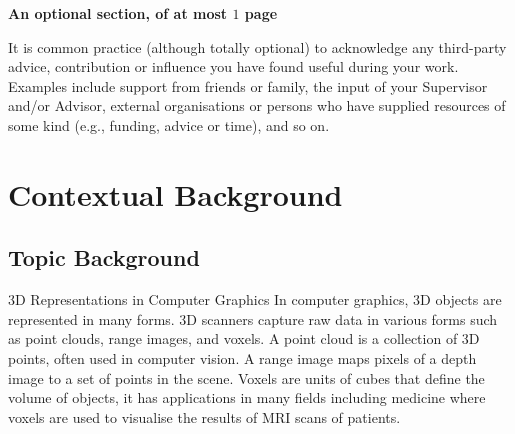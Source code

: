 \documentclass[ %
                    author={Dillon Keith Diep},
                supervisor={Dr. Carl Henrik Ek},
                    degree={MEng},
                     title={Assisted Content Generation for 3D Hair Geometry},
                  subtitle={[INCOMPLETE DRAFT, CONTAINS NOTES FROM RESEARCH]},
                      type={Research},
                      year={2014} ]{dissertation}
\begin{document}
{\bf An optional section, of at most $1$ page}
\vspace{1cm} 

\noindent
It is common practice (although totally optional) to acknowledge any
third-party advice, contribution or influence you have found useful
during your work.  Examples include support from friends or family, 
the input of your Supervisor and/or Advisor, external organisations 
or persons who  have supplied resources of some kind (e.g., funding, 
advice or time), and so on.


%

\mainmatter


\chapter{Contextual Background}
\label{chap:context}

\section{Topic Background}
\noindent
3D Representations in Computer Graphics
In computer graphics, 3D objects are represented in many forms. 3D scanners capture raw data in various forms such as point clouds, range images, and voxels. A point cloud is a collection of 3D points, often used in computer vision.  A range image maps pixels of a depth image to a set of points in the scene. Voxels are units of cubes that define the volume of objects, it has applications in many fields including medicine where voxels are used to visualise the results of MRI scans of patients.\cite{mri}
\end{document}
